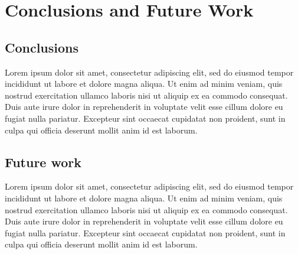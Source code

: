 \chapter{Conclusions and Future Work}\label{ch:conclusions}

\section{Conclusions}\label{sec:conclusions}
Lorem ipsum dolor sit amet, consectetur adipiscing elit, sed do eiusmod tempor incididunt ut labore et dolore magna aliqua. Ut enim ad minim veniam, quis nostrud exercitation ullamco laboris nisi ut aliquip ex ea commodo consequat. Duis aute irure dolor in reprehenderit in voluptate velit esse cillum dolore eu fugiat nulla pariatur. Excepteur sint occaecat cupidatat non proident, sunt in culpa qui officia deserunt mollit anim id est laborum.

\section{Future work}\label{sec:future}
Lorem ipsum dolor sit amet, consectetur adipiscing elit, sed do eiusmod tempor incididunt ut labore et dolore magna aliqua. Ut enim ad minim veniam, quis nostrud exercitation ullamco laboris nisi ut aliquip ex ea commodo consequat. Duis aute irure dolor in reprehenderit in voluptate velit esse cillum dolore eu fugiat nulla pariatur. Excepteur sint occaecat cupidatat non proident, sunt in culpa qui officia deserunt mollit anim id est laborum.
